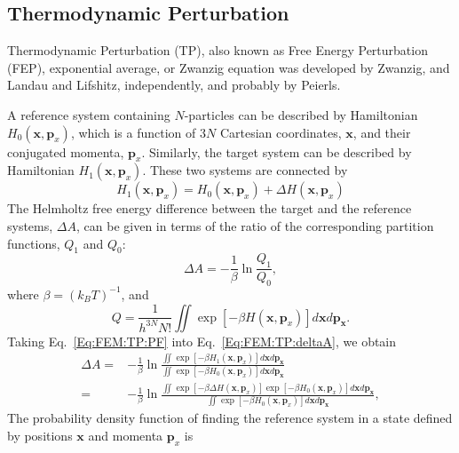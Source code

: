 \subsection{Thermodynamic Perturbation\label{Sec:FEM:TP}}
Thermodynamic Perturbation (TP), also known as Free Energy Perturbation (FEP), exponential average, or Zwanzig equation was developed by Zwanzig,\cite{ZwanzigJCP1954} and Landau and Lifshitz, independently, and probably by Peierls\cite{JorgensenJCTC2008}. 

A reference system containing $N$-particles can be described by Hamiltonian $H_{0}(\mathbf{x},\mathbf{p}_{x})$, which is a function of $3N$ Cartesian coordinates, $\mathbf{x}$, and their conjugated momenta, $\mathbf{p}_{x}$. Similarly, the target system can be described by Hamiltonian $H_{1}(\mathbf{x},\mathbf{p}_{x})$. These two systems are connected by 
\begin{equation}
H_{1}(\mathbf{x},\mathbf{p}_{x}) = H_{0}(\mathbf{x},\mathbf{p}_{x}) + \Delta H (\mathbf{x},\mathbf{p}_{x})
\label{Eq:FEM:TP:deltaH}
\end{equation}
The Helmholtz free energy difference between the target and the reference systems, $\Delta A$, can be given in terms of the ratio of the corresponding partition functions, $Q_{1}$ and $Q_{0}$:
\begin{equation}
\Delta A  =  -\frac{1}{\beta}\ln\frac{Q_{1}}{Q_{0}},
\label{Eq:FEM:TP:deltaA}
\end{equation}
where $\beta = {(k_{B}T)}^{-1}$, and
\begin{equation}
Q = \frac{1}{{h}^{3N}N!} \iint \exp\left[-\beta H(\mathbf{x},\mathbf{p}_{x})\right] d\mathbf{x}d\mathbf{p}_\mathbf{x}.
\label{Eq:FEM:TP:PF}
\end{equation}
Taking Eq.~\ref{Eq:FEM:TP:PF} into Eq.~\ref{Eq:FEM:TP:deltaA}, we obtain
\begin{align}
\Delta A  =&  -\frac{1}{\beta}\ln{\frac{\iint \exp\left[-\beta H_{1}(\mathbf{x},\mathbf{p}_{x})\right] d\mathbf{x}d\mathbf{p}_\mathbf{x}}{\iint \exp\left[-\beta H_{0}(\mathbf{x},\mathbf{p}_{x}) \right] d\mathbf{x}d\mathbf{p}_\mathbf{x}}}\\
=& -\frac{1}{\beta}\ln{\frac{\iint \exp\left[-\beta \Delta H(\mathbf{x},\mathbf{p}_{x})\right] \exp\left[-\beta H_{0}(\mathbf{x},\mathbf{p}_{x})\right] d\mathbf{x}d\mathbf{p}_\mathbf{x}}{\iint \exp\left[-\beta H_{0}(\mathbf{x},\mathbf{p}_{x})\right] d\mathbf{x}d\mathbf{p}_\mathbf{x}}},
\label{Eq:FEM:TP:deltaA2}
\end{align}
The probability density function of finding the reference system in a state defined by positions $\mathbf{x}$ and momenta $\mathbf{p}_{x}$ is 
